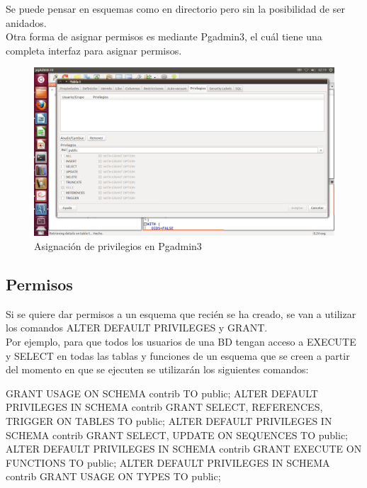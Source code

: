 Se puede pensar en esquemas como en directorio pero sin la posibilidad de ser anidados.\\

Otra forma de asignar permisos es mediante Pgadmin3, el cuál tiene una completa interfaz para asignar permisos.\\

\begin{figure}[ht!]
   \centering
   \includegraphics[scale=0.35]{imagenes/pgadmin3-privilegios.png}
   \caption{Asignación de privilegios en Pgadmin3}\label{graf:pgadmin3-privilegios}
\end{figure}

\newpage

\subsection{Permisos}

Si se quiere dar permisos a un esquema que recién se ha creado, se van a utilizar los comandos ALTER DEFAULT PRIVILEGES y GRANT.\\

Por ejemplo, para que todos los usuarios de una BD tengan acceso a EXECUTE y SELECT en todas las tablas y funciones de un esquema que se creen a partir del momento en que se ejecuten se utilizarán los siguientes comandos:\\

\begin{pyglist}
GRANT USAGE ON SCHEMA contrib TO public;
ALTER DEFAULT PRIVILEGES IN SCHEMA contrib
 GRANT SELECT, REFERENCES, TRIGGER ON TABLES
 TO public;
ALTER DEFAULT PRIVILEGES IN SCHEMA contrib
 GRANT SELECT, UPDATE ON SEQUENCES
 TO public;
ALTER DEFAULT PRIVILEGES IN SCHEMA contrib
 GRANT EXECUTE ON FUNCTIONS
TO public;
ALTER DEFAULT PRIVILEGES IN SCHEMA contrib
 GRANT USAGE ON TYPES
 TO public;
\end{pyglist}

